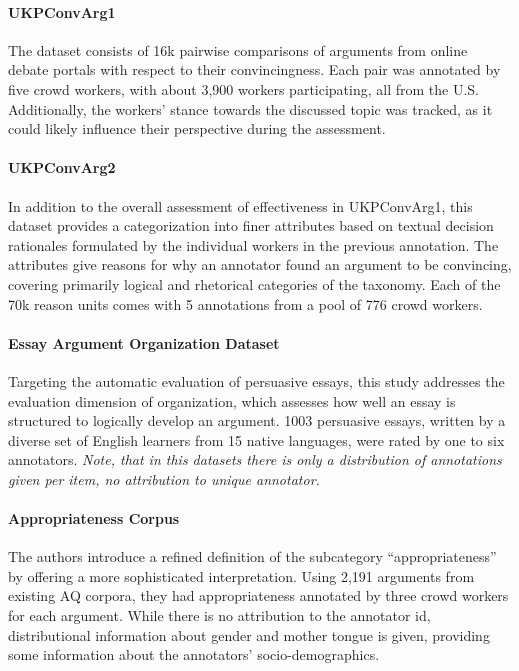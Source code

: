 \paragraph{UKPConvArg1 \cite{habernal-gurevych-2016-argument}}
The dataset consists of 16k pairwise comparisons of arguments from online debate portals with respect to their convincingness.
Each pair was annotated by five crowd workers, with about 3,900 workers participating, all from the U.S. Additionally, the workers' stance towards the discussed topic was tracked, as it could likely influence their perspective during the assessment.

\paragraph{UKPConvArg2 \cite{habernal-gurevych-2016-makes}}
In addition to the overall assessment of effectiveness in UKPConvArg1, this dataset provides a categorization into finer attributes based on textual decision rationales formulated by the individual workers in the previous annotation. The attributes give reasons for why an annotator found an argument to be convincing, covering primarily logical and rhetorical categories of the taxonomy. Each of the 70k reason units comes with 5 annotations from a pool of 776 crowd workers.

\paragraph{Essay Argument Organization Dataset \cite{persing-etal-2010-modeling}}
Targeting the automatic evaluation of persuasive essays, this study addresses the evaluation dimension of organization, which assesses how well an essay is structured to logically develop an argument.
1003 persuasive essays, written by a diverse set of English learners from 15 native languages, were rated by one to six annotators.
\textit{Note, that in this datasets there is only a distribution of annotations given per item, no attribution to unique annotator.}

\paragraph{Appropriateness Corpus \cite{ziegenbein-etal-2023-modeling}}
The authors introduce a refined definition of the subcategory ``appropriateness'' by offering a more sophisticated interpretation. Using 2,191 arguments from existing AQ corpora, they had appropriateness annotated by three crowd workers for each argument. While there is no attribution to the annotator id, distributional information about gender and mother tongue is given, providing some information about the annotators' socio-demographics.


